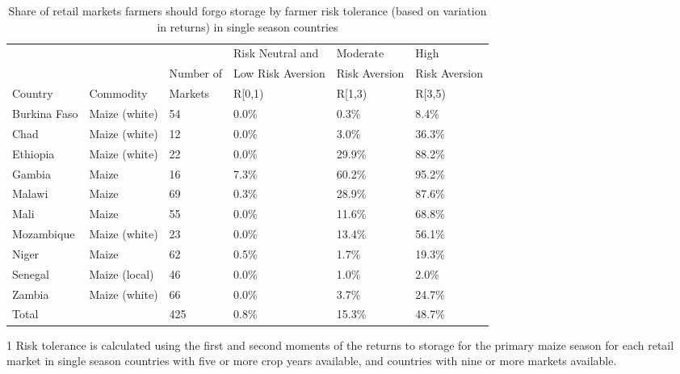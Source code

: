 \begin{table}[ht]
	\begin{threeparttable}[t]
		\centering
		\caption{Share of retail markets farmers should forgo storage by farmer risk tolerance (based on variation in returns) in single season countries}
		\label{tab:risk_return}
		\begin{tabular}{|lll|lll|}
			\hline 
			&   & & Risk Neutral and & Moderate & High \\ 
			& & Number of  & Low Risk Aversion & Risk Aversion &  Risk Aversion\\ 
			Country& Commodity & Markets& R\in[0,1) &  R\in[1,3) & R\in[3,5) \\ 
			\hline
Burkina Faso & Maize (white) & 54 & 0.0\% & 0.3\% & 8.4\% \\ 
  Chad & Maize (white) & 12 & 0.0\% & 3.0\% & 36.3\% \\ 
  Ethiopia & Maize (white) & 22 & 0.0\% & 29.9\% & 88.2\% \\ 
  Gambia & Maize & 16 & 7.3\% & 60.2\% & 95.2\% \\ 
  Malawi & Maize & 69 & 0.3\% & 28.9\% & 87.6\% \\ 
  Mali & Maize & 55 & 0.0\% & 11.6\% & 68.8\% \\ 
  Mozambique & Maize (white) & 23 & 0.0\% & 13.4\% & 56.1\% \\ 
  Niger & Maize & 62 & 0.5\% & 1.7\% & 19.3\% \\ 
  Senegal & Maize (local) & 46 & 0.0\% & 1.0\% & 2.0\% \\ 
  Zambia & Maize (white) & 66 & 0.0\% & 3.7\% & 24.7\% \\ 
  \hline
  Total &  & 425 & 0.8\% & 15.3\% & 48.7\% \\ 
  \hline
\end{tabular}
\begin{tablenotes}
\item [1] \footnotesize Risk tolerance is calculated using the first and second moments of the returns to storage for the primary maize season for each retail market in single season countries with five or more crop years available, and countries with nine or more markets available.
\end{tablenotes}
\end{threeparttable}
\end{table}